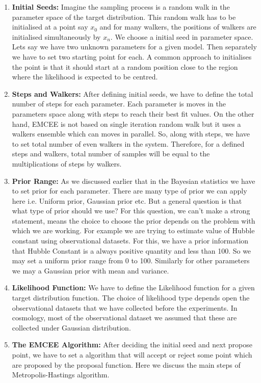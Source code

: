 \documentclass[12pt]{report}
\begin{document}
 \begin{enumerate}
 	\item
\textbf{Initial Seeds:} Imagine the sampling process is a random walk in the parameter space of the target distribution. This random walk has to be initialised at a point say $x_0$ and for many walkers, the positions of walkers are initialised simultaneously by $x_n$. We choose a initial seed in parameter space. Lets say we have two unknown parameters for a given model. Then separately we have to set two starting point for each. A common approach to initialises the point is that it should start at a random position close to the region where the likelihood is expected to be centred. 
\item	
\textbf{Steps and Walkers:} After defining initial seeds, we have to define the total number of steps for each parameter. Each parameter is moves in the parameters space along with steps to reach their best fit values. On the other hand, EMCEE is not based on single iteration random walk but it uses a walkers ensemble which can moves in parallel. So, along with steps, we have to set total number of even walkers in the system. Therefore, for a defined steps and walkers, total number of samples will be equal to the multiplications of steps by walkers.
\item	
\textbf{Prior Range:} As we discussed earlier that in the Bayesian statistics we have to set prior for each parameter. There are many type of prior we can apply here i.e. Uniform prior, Gaussian prior etc. But a general question is that what type of prior should we use? For this question, we can't make a strong statement, means the choice to choose the prior depends on the problem with which we are working. For example we are trying to estimate value of Hubble constant using observational datasets. For this, we have a prior information that Hubble Constant is a always positive quantity and less than 100. So we may set a uniform prior range from 0 to 100. Similarly for other parameters we may a Gaussian prior with mean and variance. 
\item
\textbf{Likelihood Function:} We have to define the Likelihood function for a given target distribution function. The choice of likelihood type depends open the observational datasets that we have collected before the experiments. In cosmology, most of the observational dataset we assumed that these are collected under Gaussian distribution.
\item
\textbf{The EMCEE Algorithm:} After deciding the initial seed and next propose point, we have to set a algorithm that will accept or reject some point which are proposed by the proposal function. Here we discuss the main steps of  Metropolis-Hastings algorithm.

\end{enumerate}
\end{document}
